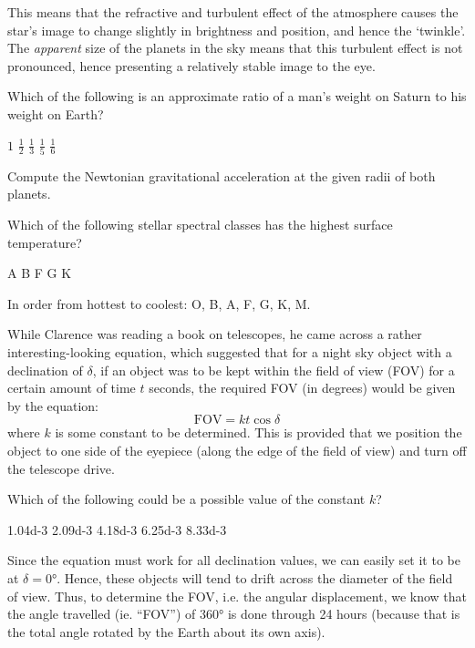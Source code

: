 \documentclass[a4paper,11pt]{exam}
\begin{document}
\begin{questions}
\begin{solution}
		This means that the refractive and turbulent effect of the atmosphere causes the star's image to change slightly in brightness and position, and hence the `twinkle'. The \textit{apparent} size of the planets in the sky means that this turbulent effect is not pronounced, hence presenting a relatively stable image to the eye.
	\end{solution}

\filbreak
\question
	Which of the following is an approximate ratio of a man’s weight on Saturn to his weight on Earth?

	\begin{oneparchoices}
		\correctchoice $1$
		\choice $ \displaystyle \frac{1}{2} $
		\choice $ \displaystyle \frac{1}{3} $
		\choice $ \displaystyle \frac{1}{5} $
		\choice $ \displaystyle \frac{1}{6} $
	\end{oneparchoices}
	\begin{solution}
		Compute the Newtonian gravitational acceleration at the given radii of both planets.
	\end{solution}

\filbreak
\question
	Which of the following stellar spectral classes has the highest surface temperature?

	\begin{oneparchoices}
		\choice A
		\correctchoice	B
		\choice	F
		\choice G
		\choice K
	\end{oneparchoices}
	\begin{solution}
		In order from hottest to coolest: O, B, A, F, G, K, M.
	\end{solution}

\filbreak
\question
	While Clarence was reading a book on telescopes, he came across a rather interesting-looking equation, which suggested that for a night sky object with a declination of $ \delta $, if an object was to be kept within the field of view (FOV) for a certain amount of time $ t $ seconds, the required FOV (in degrees) would be given by the equation:
	\[ \text{FOV} = kt\cos{\delta}\]
	where $ k $ is some constant to be determined. This is provided that we position the object to one side of the eyepiece (along the edge of the field of view) and turn off the telescope drive.

	Which of the following could be a possible value of the constant $ k $?

	\begin{oneparchoices}
		\choice \num{1.04d-3}
		\choice \num{2.09d-3}
		\correctchoice \num{4.18d-3}
		\choice \num{6.25d-3}
		\choice \num{8.33d-3}
	\end{oneparchoices}
	\begin{solution}
		Since the equation must work for all declination values, we can easily set it to be at $ \delta= \ang{0} $. Hence, these objects will tend to drift across the diameter of the field of view. Thus, to determine the FOV, i.e. the angular displacement, we know that the angle travelled (ie. “FOV”) of $ \ang{360} $ is done through 24 hours (because that is the total angle rotated by the Earth about its own axis).


\end{solution}
\end{questions}
\end{document}
